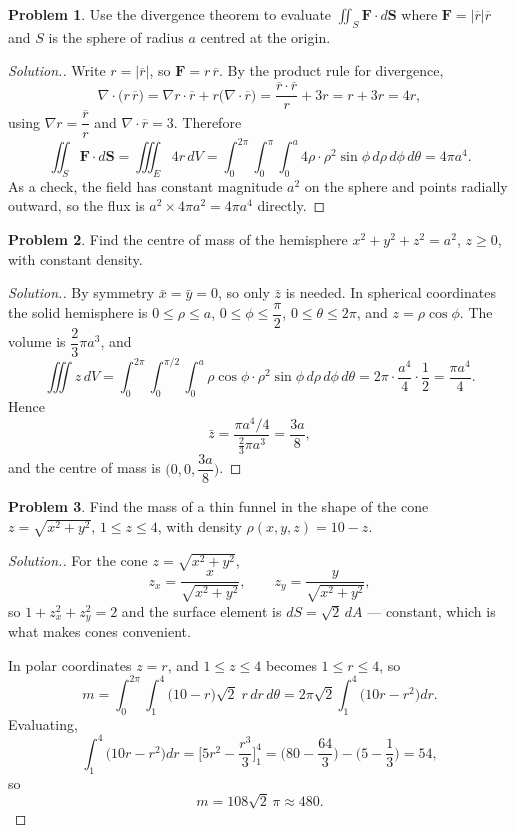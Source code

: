\documentclass[11pt,a4paper]{article}
\theoremstyle{definition}
\newtheorem{problemx}{Problem}[subsection]
\newenvironment{problem}{\begin{problemx}}{\end{problemx}}
\newenvironment{solution}
  {\renewcommand{\qedsymbol}{}\begin{proof}[\textit{Solution}.]}
  {\end{proof}}
\begin{document}
\begin{problem}
Use the divergence theorem to evaluate
$\displaystyle{\iint_S\textbf{F}\cdot d\textbf{S}}$ where
$\textbf{F} = \left|\overline{r}\right|\overline{r}$ and $S$ is the sphere of
radius $a$ centred at the origin.
\end{problem}
\begin{solution}
Write $r = \left|\overline{r}\right|$, so $\textbf{F} = r\,\overline{r}$. By the
product rule for divergence,
$$\nabla\cdot\big(r\,\overline{r}\big)
= \nabla r\cdot\overline{r} + r\big(\nabla\cdot\overline{r}\big)
= \frac{\overline{r}\cdot\overline{r}}{r} + 3r = r + 3r = 4r ,$$
using $\nabla r = \dfrac{\overline{r}}{r}$ and
$\nabla\cdot\overline{r} = 3$. Therefore
$$\iint_S\textbf{F}\cdot d\textbf{S} = \iiint_E 4r\,dV
= \int_0^{2\pi}\int_0^{\pi}\int_0^a 4\rho\cdot\rho^2\sin\phi
\,d\rho\,d\phi\,d\theta = 4\pi a^4 .$$
As a check, the field has constant magnitude $a^2$ on the sphere and points
radially outward, so the flux is $a^2\times 4\pi a^2 = 4\pi a^4$ directly.
\end{solution}

\begin{problem}
Find the centre of mass of the hemisphere $x^2+y^2+z^2 = a^2$, $z\geq 0$, with
constant density.
\end{problem}
\begin{solution}
By symmetry $\bar x = \bar y = 0$, so only $\bar z$ is needed. In spherical
coordinates the solid hemisphere is
$0\leq\rho\leq a$, $0\leq\phi\leq\dfrac{\pi}{2}$,
$0\leq\theta\leq 2\pi$, and $z = \rho\cos\phi$. The volume is
$\dfrac23\pi a^3$, and
$$\iiint z\,dV
= \int_0^{2\pi}\int_0^{\pi/2}\int_0^a
\rho\cos\phi\cdot\rho^2\sin\phi\,d\rho\,d\phi\,d\theta
= 2\pi\cdot\frac{a^4}{4}\cdot\frac12 = \frac{\pi a^4}{4}.$$
Hence
$$\bar z = \frac{\pi a^4/4}{\frac23\pi a^3} = \frac{3a}{8},$$
and the centre of mass is $\Big(0,0,\dfrac{3a}{8}\Big)$.
\end{solution}

\begin{problem}
Find the mass of a thin funnel in the shape of the cone
$z = \sqrt{x^2+y^2}$, $1\leq z\leq 4$, with density
$\rho(x,y,z) = 10-z$.
\end{problem}
\begin{solution}
For the cone $z = \sqrt{x^2+y^2}$,
$$z_x = \frac{x}{\sqrt{x^2+y^2}},\qquad z_y = \frac{y}{\sqrt{x^2+y^2}},$$
so $1+z_x^2+z_y^2 = 2$ and the surface element is
$dS = \sqrt2\,dA$ --- constant, which is what makes cones convenient.

In polar coordinates $z = r$, and $1\leq z\leq 4$ becomes $1\leq r\leq 4$, so
$$m = \int_0^{2\pi}\int_1^4\big(10-r\big)\sqrt2\;r\,dr\,d\theta
= 2\pi\sqrt2\int_1^4\big(10r-r^2\big)dr .$$
Evaluating,
$$\int_1^4\big(10r-r^2\big)dr = \Big[5r^2-\frac{r^3}{3}\Big]_1^4
= \Big(80-\frac{64}{3}\Big) - \Big(5-\frac13\Big) = 54 ,$$
so
$$m = 108\sqrt2\,\pi \approx 480 .$$
\end{solution}
\end{document}
